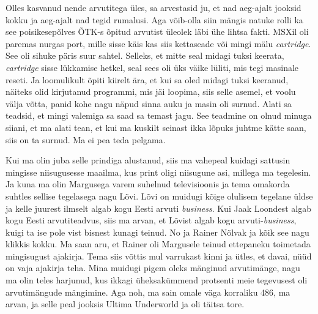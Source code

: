 
Olles kasvanud nende arvutitega üles, sa arvestasid ju, et nad aeg-ajalt jooksid kokku ja aeg-ajalt nad tegid rumalusi. Aga võib-olla siin mängis natuke rolli ka see  poisikesepõlves ÕTK-s õpitud arvutist üleolek läbi ühe lihtsa fakti. MSXil oli paremas nurgas port, mille sisse käis kas siis kettaseade või mingi mälu \emph{cartridge}. See oli sihuke päris suur sahtel. Selleks, et mitte seal midagi tuksi keerata, \emph{cartridge} sisse lükkamise hetkel, seal sees oli üks väike lüliti, mis tegi masinale reseti. Ja loomulikult õpiti kiirelt ära, et kui sa oled midagi tuksi keeranud, näiteks olid kirjutanud programmi, mis jäi loopima, siis selle asemel, et voolu välja võtta, panid kohe nagu näpud sinna auku ja masin oli surnud. Alati sa teadsid, et mingi valemiga sa saad sa temast jagu. See teadmine on olnud minuga siiani, et ma alati tean, et kui ma kuskilt seinast ikka lõpuks juhtme kätte saan, siis on ta surnud. Ma ei pea teda pelgama.


Kui ma olin juba selle prindiga alustanud, siis ma vahepeal kuidagi sattusin mingisse niisugusesse maailma, kus print oligi niisugune asi, millega ma tegelesin. Ja kuna ma olin Margusega varem suhelnud  televisioonis ja tema omakorda suhtles sellise tegelasega nagu Lõvi. Lõvi on muidugi kõige olulisem tegelane üldse ja kelle juurest ilmselt algab kogu Eesti arvuti \emph{business}. Kui Jaak Loondest algab kogu Eesti arvutiteadvus, siis ma arvan, et Lõvist algab kogu arvuti-\emph{business}, kuigi ta ise pole vist bisnest kunagi teinud. No ja Rainer Nõlvak ja kõik see nagu klikkis kokku. Ma saan aru, et Rainer oli Margusele teinud ettepaneku toimetada mingisugust ajakirja. Tema siis võttis mul varrukast kinni ja ütles, et davai, nüüd on vaja ajakirja teha. Mina muidugi pigem oleks mänginud arvutimänge, nagu ma olin teles harjunud, kus ikkagi üheksakümmend protsenti meie tegevusest oli arvutimängude mängimine. Aga noh, ma sain omale väga korraliku 486, ma arvan, ja selle peal jooksis Ultima Underworld ja oli täitsa tore. 

